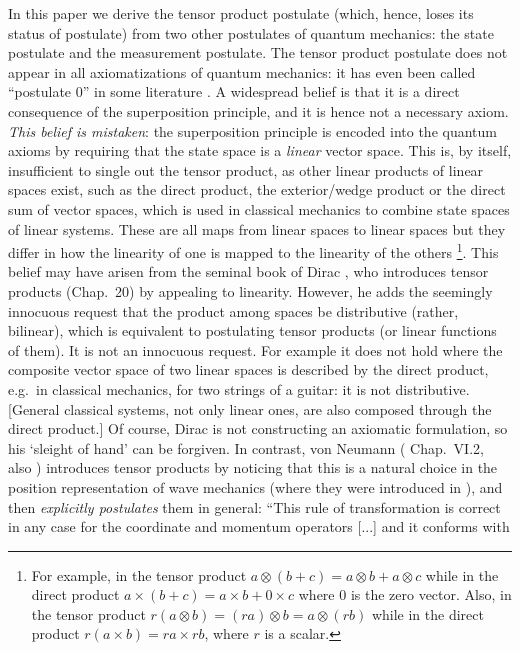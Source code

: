\documentclass[aps,prl,amsmath,amssymb,twocolumn]{revtex4}
\theoremstyle{plain}
\theoremstyle{definition}
\theoremstyle{remark}
\begin{document}
In this paper we derive the tensor product postulate (which, hence,
loses its status of postulate) from two other postulates of quantum
mechanics: the state postulate and the measurement postulate.  The
tensor product postulate does not appear in all axiomatizations of
quantum mechanics: it has even been called ``postulate 0'' in some
literature \cite{zurek}. A widespread belief is that it is a direct
consequence of the superposition principle, and it is hence not a
necessary axiom. {\em This belief is mistaken}: the superposition
principle is encoded into the quantum axioms by requiring that the
state space is a {\em linear} vector space. This is, by itself,
insufficient to single out the tensor product, as other linear
products of linear spaces exist, such as the direct product, the
exterior/wedge product or the direct sum of vector spaces, which is
used in classical mechanics to combine state spaces of linear systems.
These are all maps from linear spaces to linear spaces but they differ
in how the linearity of one is mapped to the linearity of the others
\footnote{For example, in the tensor product
  $a \otimes (b+c) = a \otimes b + a \otimes c$ while in the direct
  product $a \times (b+c) = a \times b + 0 \times c$ where $0$ is the
  zero vector. Also, in the tensor product
  $r (a \otimes b) = (r a) \otimes b = a \otimes (r b)$ while in the
  direct product $r (a \times b) = r a \times r b$, where $r$ is a
  scalar.}.  This belief may have arisen from the seminal book of
Dirac \cite{diracbook}, who introduces tensor products (Chap.~20) by
appealing to linearity. However, he adds the seemingly innocuous
request that the product among spaces be distributive (rather,
bilinear), which is equivalent to postulating tensor products (or
linear functions of them). It is not an innocuous request. For example
it does not hold where the composite vector space of two linear spaces
is described by the direct product, e.g.~in classical mechanics, for
two strings of a guitar: it is not distributive.  [General classical
systems, not only linear ones, are also composed through the direct
product.] Of course, Dirac is not constructing an axiomatic
formulation, so his `sleight of hand' can be forgiven. In contrast,
von Neumann (\cite{vonneumannbook} Chap.~VI.2, also \cite{jauch})
introduces tensor products by noticing that this is a natural choice
in the position representation of wave mechanics (where they were
introduced in \cite{weyl,epr}), and then {\em explicitly postulates}
them in general: ``This rule of transformation is correct in any case
for the coordinate and momentum operators [...]  and it conforms with
\end{document}
